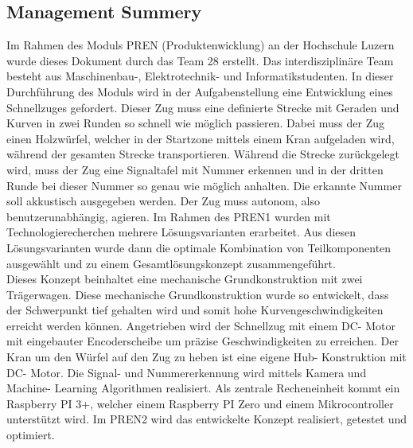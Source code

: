\documentclass[../../main.tex]{subfiles}
\begin{document}
\subsection{Management Summery}
Im Rahmen des Moduls PREN (Produktenwicklung) an der Hochschule Luzern wurde dieses Dokument durch das Team 28 erstellt. Das interdisziplinäre Team besteht aus Maschinenbau-, Elektrotechnik- und Informatikstudenten. In dieser Durchführung des Moduls wird in der Aufgabenstellung eine Entwicklung eines Schnellzuges gefordert. Dieser Zug muss eine definierte Strecke mit Geraden und Kurven in zwei Runden so schnell wie möglich passieren. Dabei muss der Zug einen Holzwürfel, welcher in der Startzone mittels einem Kran aufgeladen wird, während der gesamten Strecke transportieren. Während die Strecke zurückgelegt wird, muss der Zug eine Signaltafel mit Nummer erkennen und in der dritten Runde bei dieser Nummer so genau wie möglich anhalten. Die erkannte Nummer soll akkustisch ausgegeben werden. Der Zug muss autonom, also benutzerunabhängig, agieren. Im Rahmen des PREN1 wurden mit Technologierecherchen mehrere Lösungsvarianten erarbeitet. Aus diesen Lösungsvarianten wurde dann die optimale Kombination von Teilkomponenten ausgewählt und zu einem Gesamtlösungskonzept zusammengeführt.\\
Dieses Konzept beinhaltet eine mechanische Grundkonstruktion mit zwei Trägerwagen. Diese mechanische Grundkonstruktion wurde so entwickelt, dass der Schwerpunkt tief gehalten wird und somit hohe Kurvengeschwindigkeiten erreicht werden können. Angetrieben wird der Schnellzug mit einem DC- Motor mit eingebauter Encoderscheibe um präzise Geschwindigkeiten zu erreichen. Der Kran um den Würfel auf den Zug zu heben ist eine eigene Hub- Konstruktion mit DC- Motor. Die Signal- und Nummererkennung wird mittels Kamera und Machine- Learning Algorithmen realisiert. Als zentrale Recheneinheit kommt ein Raspberry PI 3+, welcher einem Raspberry PI Zero und einem Mikrocontroller unterstützt wird. Im PREN2 wird das entwickelte Konzept realisiert, getestet und optimiert.
\pagebreak
\end{document}
